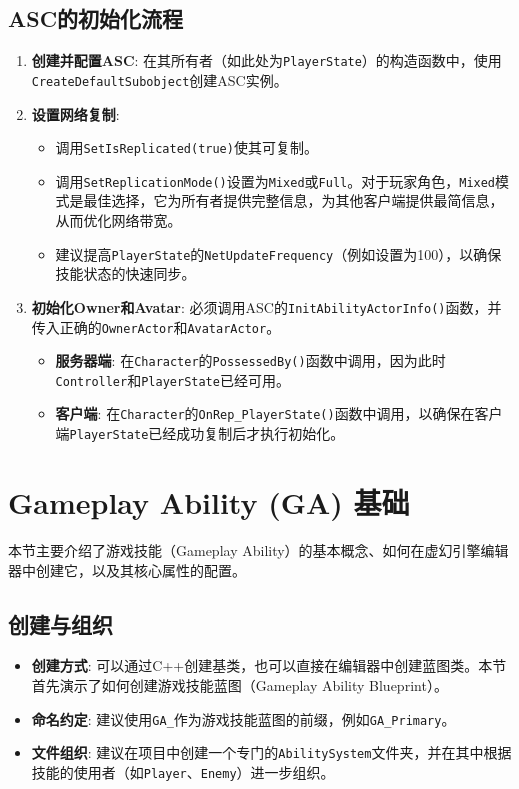 \documentclass[math,code,10pt,CJKmath]{amznotes}
\begin{document}
\subsection{ASC的初始化流程}
\begin{enumerate}
    \item \textbf{创建并配置ASC}: 在其所有者（如此处为\texttt{PlayerState}）的构造函数中，使用\texttt{CreateDefaultSubobject}创建ASC实例。
    \item \textbf{设置网络复制}:
    \begin{itemize}
        \item 调用\texttt{SetIsReplicated(true)}使其可复制。
        \item 调用\texttt{SetReplicationMode()}设置为\texttt{Mixed}或\texttt{Full}。对于玩家角色，\texttt{Mixed}模式是最佳选择，它为所有者提供完整信息，为其他客户端提供最简信息，从而优化网络带宽。
        \item 建议提高\texttt{PlayerState}的\texttt{NetUpdateFrequency}（例如设置为100），以确保技能状态的快速同步。
    \end{itemize}
    \item \textbf{初始化Owner和Avatar}: 必须调用ASC的\texttt{InitAbilityActorInfo()}函数，并传入正确的\texttt{OwnerActor}和\texttt{AvatarActor}。
    \begin{itemize}
        \item \textbf{服务器端}: 在\texttt{Character}的\texttt{PossessedBy()}函数中调用，因为此时\texttt{Controller}和\texttt{PlayerState}已经可用。
        \item \textbf{客户端}: 在\texttt{Character}的\texttt{OnRep\_PlayerState()}函数中调用，以确保在客户端\texttt{PlayerState}已经成功复制后才执行初始化。
    \end{itemize}
\end{enumerate}


\section{Gameplay Ability (GA) 基础}
本节主要介绍了游戏技能（Gameplay Ability）的基本概念、如何在虚幻引擎编辑器中创建它，以及其核心属性的配置。

\subsection{创建与组织}
\begin{itemize}
    \item \textbf{创建方式}: 可以通过C++创建基类，也可以直接在编辑器中创建蓝图类。本节首先演示了如何创建游戏技能蓝图（Gameplay Ability Blueprint）。
    \item \textbf{命名约定}: 建议使用\texttt{GA\_}作为游戏技能蓝图的前缀，例如\texttt{GA\_Primary}。
    \item \textbf{文件组织}: 建议在项目中创建一个专门的\texttt{AbilitySystem}文件夹，并在其中根据技能的使用者（如\texttt{Player}、\texttt{Enemy}）进一步组织。
\end{itemize}
\end{document}
